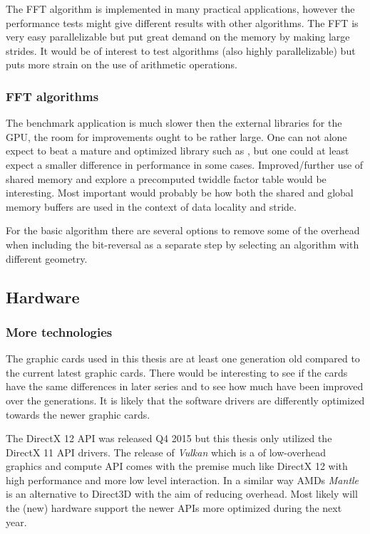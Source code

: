 The FFT algorithm is implemented in many practical applications, however the performance tests might give different results with other algorithms. The FFT is very easy parallelizable but put great demand on the memory by making large strides. It would be of interest to test algorithms (also highly parallelizable) but puts more strain on the use of arithmetic operations.

\subsubsection{FFT algorithms}

The benchmark application is much slower then the external libraries for the GPU, the room for improvements ought to be rather large. One can not alone expect to beat a mature and optimized library such as {\CUFFT}, but one could at least expect a smaller difference in performance in some cases. Improved/further use of shared memory and explore a precomputed twiddle factor table would be interesting. Most important would probably be how both the shared and global memory buffers are used in the context of data locality and stride.

For the basic algorithm there are several options to remove some of the overhead when including the bit-reversal as a separate step by selecting an algorithm with different geometry.

\subsection{Hardware}

\subsubsection{More technologies}

The graphic cards used in this thesis are at least one generation old compared to the current latest graphic cards. There would be interesting to see if the cards have the same differences in later series and to see how much have been improved over the generations. It is likely that the software drivers are differently optimized towards the newer graphic cards.

The DirectX 12 API was released Q4 2015 but this thesis only utilized the DirectX 11 API drivers. The release of \emph{Vulkan} which is a of low-overhead graphics and compute API comes with the premise much like DirectX 12 with high performance and more low level interaction. In a similar way AMDs \emph{Mantle} is an alternative to Direct3D with the aim of reducing overhead. Most likely will the (new) hardware support the newer APIs more optimized during the next year.

